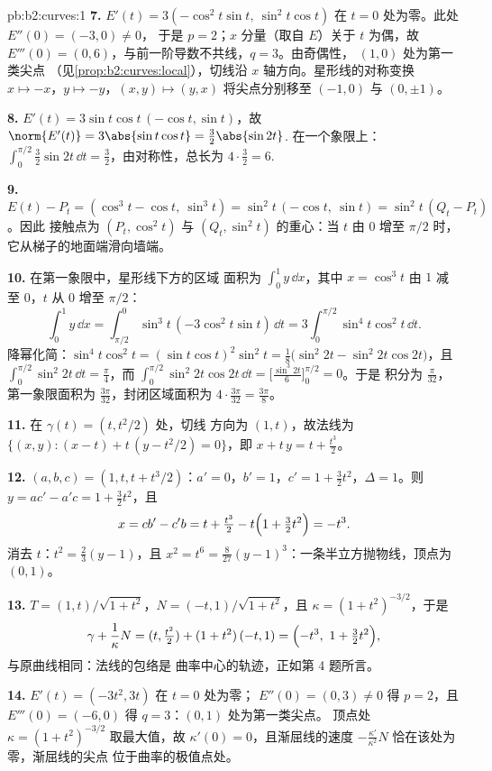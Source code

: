 \begin{solution}{pb:b2:curves:1}
\textbf{7.} $E'(t) = 3(-\cos^2 t\sin t,\ \sin^2 t\cos t)$
在 $t = 0$ 处为零。此处 $E''(0) = (-3, 0) \neq 0$，
于是 $p = 2$；$x$ 分量（取自 $E$）关于 $t$ 为偶，故
$E'''(0) = (0, 6)$，与前一阶导数不共线，$q = 3$。由奇偶性，
$(1, 0)$ 处为第一类尖点
（见\cref{prop:b2:curves:local}），切线沿
$x$ 轴方向。星形线的对称变换 $x \mapsto -x$，$y \mapsto -y$，$(x,
y) \mapsto (y, x)$ 将尖点分别移至 $(-1,
0)$ 与 $(0, \pm1)$。

\textbf{8.} $E'(t) = 3\sin t\cos t\,(-\cos t, \sin t)$，故
$\norm{E'(t)} = 3\abs{\sin t\cos t} = \tfrac32\abs{\sin 2t}$.
在一个象限上：$\int_0^{\pi/2}\tfrac32\sin 2t\,\dd t =
\tfrac32$，由对称性，总长为 $4 \cdot
\tfrac32 = 6$.

\textbf{9.} $E(t) - P_t = (\cos^3 t - \cos t,\ \sin^3 t) =
\sin^2 t\,(-\cos t,\ \sin t) = \sin^2 t\,(Q_t - P_t)$。因此
接触点为 $(P_t, \cos^2 t)$ 与
$(Q_t, \sin^2 t)$ 的重心：当 $t$ 由 $0$ 增至 $\pi/2$ 时，
它从梯子的地面端滑向墙端。

\textbf{10.} 在第一象限中，星形线下方的区域
面积为 $\int_0^1 y\,\dd x$，其中 $x = \cos^3 t$
由 $1$ 减至 $0$，$t$ 从 $0$ 增至 $\pi/2$：
\[
\int_0^1 y\,\dd x
= \int_{\pi/2}^{0}\sin^3 t\,(-3\cos^2 t\sin t)\,\dd t
= 3\int_0^{\pi/2}\sin^4 t\cos^2 t\,\dd t .
\]
降幂化简：$\sin^4 t\cos^2 t = (\sin t\cos t)^2\sin^2 t =
\tfrac18\bigl(\sin^2 2t - \sin^2 2t\cos 2t\bigr)$，且
$\int_0^{\pi/2}\sin^2 2t\,\dd t = \tfrac\pi4$，而
$\int_0^{\pi/2}\sin^2 2t\cos 2t\,\dd t =
\bigl[\tfrac{\sin^3 2t}6\bigr]_0^{\pi/2} = 0$。于是
积分为 $\tfrac\pi{32}$，第一象限面积为
$\tfrac{3\pi}{32}$，封闭区域面积为 $4 \cdot
\tfrac{3\pi}{32} = \tfrac{3\pi}8$。

\textbf{11.} 在 $\gamma(t) = (t, t^2/2)$ 处，切线
方向为 $(1, t)$，故法线为 $\{(x, y) : (x -
t) + t\,(y - t^2/2) = 0\}$，即 $x + t\,y = t +
\tfrac{t^3}2$。

\textbf{12.} $(a, b, c) = (1, t, t + t^3/2)$：$a' = 0$，$b' =
1$，$c' = 1 + \tfrac32 t^2$，$\Delta = 1$。则 $y = ac' -
a'c = 1 + \tfrac32t^2$，且
\[
x = cb' - c'b = t + \tfrac{t^3}2 - t\Bigl(1 +
\tfrac32t^2\Bigr) = -t^3 .
\]
消去 $t$：$t^2 = \tfrac23(y - 1)$，且 $x^2 = t^6 =
\tfrac8{27}(y - 1)^3$：一条半立方抛物线，顶点为
$(0, 1)$。

\textbf{13.} $T = (1, t)/\sqrt{1+t^2}$，$N = (-t,
1)/\sqrt{1+t^2}$，且 $\kappa = (1+t^2)^{-3/2}$，于是
\[
\gamma + \frac1\kappa N = (t, \tfrac{t^2}2) +
(1+t^2)\,(-t, 1) = \Bigl(-t^3,\ 1 + \tfrac32t^2\Bigr),
\]
与原曲线相同：法线的包络是
曲率中心的轨迹，正如第 4 题所言。

\textbf{14.} $E'(t) = (-3t^2, 3t)$ 在 $t = 0$ 处为零；
$E''(0) = (0, 3) \neq 0$ 得 $p = 2$，且 $E'''(0) = (-6,
0)$ 得 $q = 3$：$(0, 1)$ 处为第一类尖点。
顶点处 $\kappa = (1+t^2)^{-3/2}$ 取最大值，故
$\kappa'(0) = 0$，且渐屈线的速度
$-\frac{\kappa'}{\kappa^2}N$ 恰在该处为零，渐屈线的尖点
位于曲率的极值点处。


\end{solution}
